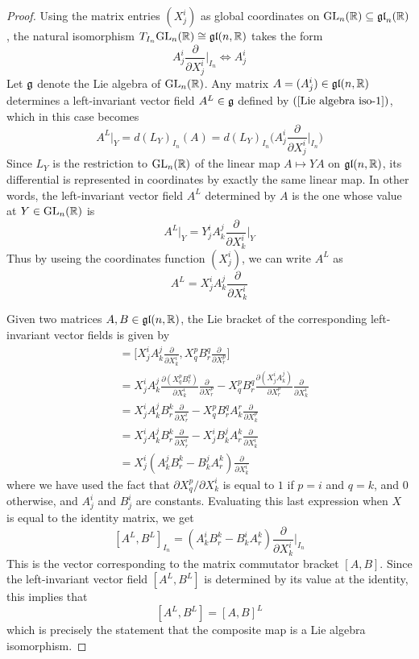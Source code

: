 \begin{proof}
Using the matrix entries $(X^i_j)$ as global coordinates on $\mathrm{GL}_n(\mathbb{R})\subseteq\mathfrak{gl}_n(\mathbb{R})$, the natural isomorphism $T_{I_n}\mathrm{GL}_n(\mathbb{R})\cong\mathfrak{gl}(n,\mathbb{R})$ takes the form
\[A^i_j\frac{\partial}{\partial X^i_j}\Big|_{I_n}\Longleftrightarrow A^i_j\]
Let $\mathfrak{g}$ denote the Lie algebra of $\mathrm{GL}_n(\mathbb{R})$. Any matrix $A=(A^i_j)\in\mathfrak{gl}(n,\mathbb{R})$ determines a left-invariant vector field $A^L\in\mathfrak{g}$ defined by $(\ref{Lie algebra iso-1})$, which in this case becomes
\[A^L|_Y=d(L_Y)_{I_n}(A)=d(L_Y)_{I_n}\Big(A^i_j\frac{\partial}{\partial X^i_j}\Big|_{I_n}\Big)\]
Since $L_Y$ is the restriction to $\mathrm{GL}_n(\mathbb{R})$ of the linear map $A\mapsto YA$ on $\mathfrak{gl}(n,\mathbb{R})$, its differential is represented in coordinates by exactly the same linear map. In other words, the left-invariant vector field $A^L$ determined by $A$ is the one whose value at $Y\in\mathrm{GL}_n(\mathbb{R})$ is
\begin{equation}\label{Lie algrbra gl(n,R)}
A^L|_Y=Y^i_jA^j_k\frac{\partial}{\partial X^i_k}\Big|_Y
\end{equation}
Thus by useing the coordinates function $(X^i_j)$, we can write $A^L$ as
\[A^L=X^i_jA^j_k\frac{\partial}{\partial X^i_k}\]

Given two matrices $A,B\in\mathfrak{gl}(n,\mathbb{R})$, the Lie bracket of the corresponding left-invariant vector fields is given by
\begin{align*}
[A^L,B^L]&=\Big[X^i_jA^j_k\frac{\partial}{\partial X^i_k},X^p_qB^q_r\frac{\partial}{\partial X^p_r}\Big]\\
&=X^i_jA^j_k\frac{\partial(X^p_qB^q_r)}{\partial X^i_k}\frac{\partial}{\partial X^p_r}-X^p_qB^q_r\frac{\partial(X^i_jA^j_k)}{\partial X^p_r}\frac{\partial}{\partial X^i_k}\\
&=X^i_jA^j_kB^k_r\frac{\partial}{\partial X^i_r}-X^p_qB^q_rA^r_k\frac{\partial }{\partial X^p_k}\\
&=X^i_jA^j_kB^k_r\frac{\partial}{\partial X^i_r}-X^i_jB^j_kA^k_r\frac{\partial}{\partial X^i_k}\\
&=X^i_j(A^j_kB^k_r-B^j_kA^k_r)\frac{\partial}{\partial X^i_k}
\end{align*}
where we have used the fact that $\partial X^p_q/\partial X^i_k$ is equal to $1$ if $p=i$ and $q=k$, and $0$ otherwise, and $A^i_j$ and $B^i_j$ are constants. Evaluating this last expression when $X$ is equal to the identity matrix, we get
\[[A^L,B^L]_{I_n}=(A^i_kB^k_r-B^i_kA^k_r)\frac{\partial}{\partial X^i_k}\Big|_{I_n}\]
This is the vector corresponding to the matrix commutator bracket $[A,B]$. Since the left-invariant vector field $[A^L,B^L]$ is determined by its value at the identity, this implies that
\[[A^L,B^L]=[A,B]^L\]
which is precisely the statement that the composite map is a Lie algebra isomorphism.
\end{proof}
